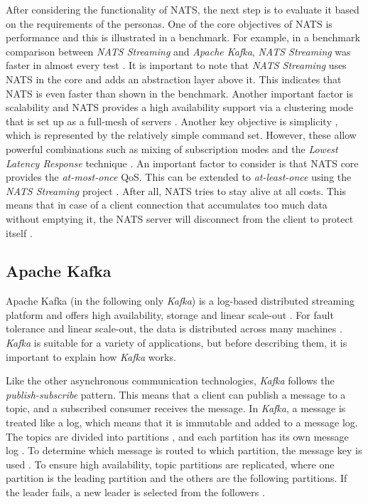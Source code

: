 After considering the functionality of \ac{NATS}, the next step is to evaluate it based on the requirements of the personas.
One of the core objectives of \ac{NATS} is performance \cite[p.~8]{Quevedo.2018} and this is illustrated in a benchmark.
For example, in a benchmark comparison between \textit{NATS Streaming} and \textit{Apache Kafka}, \textit{NATS Streaming} was faster in almost every test \cite{TylerTreat.2016}.
It is important to note that \textit{NATS Streaming} uses \ac{NATS} in the core and adds an abstraction layer above it.
This indicates that \ac{NATS} is even faster than shown in the benchmark.
Another important factor is scalability and \ac{NATS} provides a high availability support via a clustering mode that is set up as a full-mesh of servers \cite[p.~8]{Quevedo.2018}.
Another key objective is simplicity \cite[p.~8]{Quevedo.2018}, which is represented by the relatively simple command set.
However, these allow powerful combinations such as mixing of subscription modes \cite[p.~35f.]{Quevedo.2018} and the \textit{Lowest Latency Response} technique \cite[p.~40f.]{Quevedo.2018}.
An important factor to consider is that \ac{NATS} core provides the \textit{at-most-once} \ac{QoS}.
This can be extended to \textit{at-least-once} using the \textit{NATS Streaming} project \cite[p.~10f.]{Quevedo.2018}.
After all, \ac{NATS} tries to stay alive at all costs.
This means that in case of a client connection that accumulates too much data without emptying it, the \ac{NATS} server will disconnect from the client to protect itself \cite[p.~9]{Quevedo.2018}.

\subsection{Apache Kafka}\label{cha:Technologies:communication:kafka}

Apache Kafka (in the following only \textit{Kafka}) is a log-based distributed streaming platform and offers high availability, storage and linear scale-out \cite[p.~14]{Stopford.2018}.
For fault tolerance and linear scale-out, the data is distributed across many machines \cite[p.~17f.]{Stopford.2018}.
\textit{Kafka} is suitable for a variety of applications, but before describing them, it is important to explain how \textit{Kafka} works.

Like the other asynchronous communication technologies, \textit{Kafka} follows the \textit{publish-subscribe} pattern.
This means that a client can publish a message to a topic, and a subscribed consumer receives the message.
In \textit{Kafka}, a message is treated like a log, which means that it is immutable and added to a message log.
The topics are divided into partitions \cite[p.~30]{Kumar.2017}, and each partition has its own message log \cite[p.~33]{Kumar.2017}.
To determine which message is routed to which partition, the message key is used \cite[p.~41]{Kumar.2017}.
To ensure high availability, topic partitions are replicated, where one partition is the leading partition and the others are the following partitions.
If the leader fails, a new leader is selected from the followers \cite[p.~33]{Kumar.2017}.

